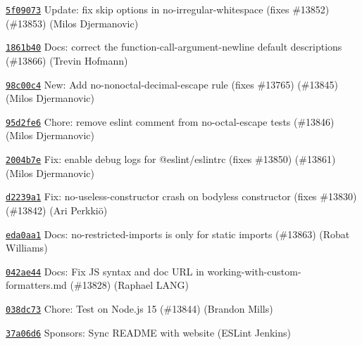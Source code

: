 \begin{DoxyItemize}
\item \href{https://github.com/eslint/eslint/commit/5f0907399a9666dec78c74384c8969c01483c30e}{\texttt{ {\ttfamily 5f09073}}} Update\+: fix \textquotesingle{}skip\textquotesingle{} options in no-\/irregular-\/whitespace (fixes \#13852) (\#13853) (Milos Djermanovic)
\item \href{https://github.com/eslint/eslint/commit/1861b4086f1018f43ab19744d866d5da986c500d}{\texttt{ {\ttfamily 1861b40}}} Docs\+: correct the function-\/call-\/argument-\/newline \textquotesingle{}default\textquotesingle{} descriptions (\#13866) (Trevin Hofmann)
\item \href{https://github.com/eslint/eslint/commit/98c00c41d2aecb3a990393d430694f4ce6b47de5}{\texttt{ {\ttfamily 98c00c4}}} New\+: Add no-\/nonoctal-\/decimal-\/escape rule (fixes \#13765) (\#13845) (Milos Djermanovic)
\item \href{https://github.com/eslint/eslint/commit/95d2fe6057498fc1cc2193d28c8c2d1593224b33}{\texttt{ {\ttfamily 95d2fe6}}} Chore\+: remove eslint comment from no-\/octal-\/escape tests (\#13846) (Milos Djermanovic)
\item \href{https://github.com/eslint/eslint/commit/2004b7ecd3db0d4e7376cc3344246f7b9ada5801}{\texttt{ {\ttfamily 2004b7e}}} Fix\+: enable debug logs for @eslint/eslintrc (fixes \#13850) (\#13861) (Milos Djermanovic)
\item \href{https://github.com/eslint/eslint/commit/d2239a1fdec452e24ede04e990d16d42516fa538}{\texttt{ {\ttfamily d2239a1}}} Fix\+: no-\/useless-\/constructor crash on bodyless constructor (fixes \#13830) (\#13842) (Ari Perkkiö)
\item \href{https://github.com/eslint/eslint/commit/eda0aa18498dd85eb618873e8e0f4ac97032cfca}{\texttt{ {\ttfamily eda0aa1}}} Docs\+: no-\/restricted-\/imports is only for static imports (\#13863) (Robat Williams)
\item \href{https://github.com/eslint/eslint/commit/042ae44682a8a6c5037d920689124e2304056dd8}{\texttt{ {\ttfamily 042ae44}}} Docs\+: Fix JS syntax and doc URL in working-\/with-\/custom-\/formatters.\+md (\#13828) (Raphael LANG)
\item \href{https://github.com/eslint/eslint/commit/038dc73c99ae68eae2035ef303f3a947053c8f05}{\texttt{ {\ttfamily 038dc73}}} Chore\+: Test on Node.\+js 15 (\#13844) (Brandon Mills)
\item \href{https://github.com/eslint/eslint/commit/37a06d633d3669f0f43236141dc43465b8bc7ec5}{\texttt{ {\ttfamily 37a06d6}}} Sponsors\+: Sync README with website (ESLint Jenkins)
\end{DoxyItemize}

